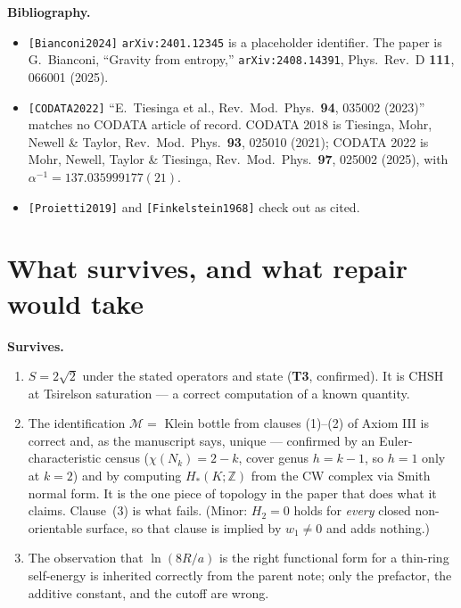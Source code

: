 \documentclass[11pt,a4paper]{article}
\begin{document}
\textbf{Bibliography.}
\begin{itemize}[leftmargin=1.2em]
\item \texttt{[Bianconi2024]} \verb|arXiv:2401.12345| is a placeholder identifier.
  The paper is G.~Bianconi, ``Gravity from entropy,''
  \verb|arXiv:2408.14391|, Phys.\ Rev.\ D \textbf{111}, 066001 (2025).
\item \texttt{[CODATA2022]} ``E.~Tiesinga et al., Rev.\ Mod.\ Phys.\ \textbf{94},
  035002 (2023)'' matches no CODATA article of record. CODATA 2018 is Tiesinga,
  Mohr, Newell \& Taylor, Rev.\ Mod.\ Phys.\ \textbf{93}, 025010 (2021); CODATA 2022
  is Mohr, Newell, Taylor \& Tiesinga, Rev.\ Mod.\ Phys.\ \textbf{97}, 025002 (2025),
  with $\alpha^{-1} = 137.035999177(21)$.
\item \texttt{[Proietti2019]} and \texttt{[Finkelstein1968]} check out as cited.
\end{itemize}

\section{What survives, and what repair would take}
\label{sec:survives}

\textbf{Survives.}
\begin{enumerate}[leftmargin=1.4em]
\item $S = 2\sqrt2$ under the stated operators and state (\textbf{T3}, confirmed).
  It is CHSH at Tsirelson saturation --- a correct computation of a known quantity.
\item The identification $\mathcal{M} = $ Klein bottle from clauses (1)--(2) of
  Axiom III is correct and, as the manuscript says, unique --- confirmed by an
  Euler-characteristic census ($\chi(N_k)=2-k$, cover genus $h=k-1$, so $h=1$ only at
  $k=2$) and by computing $H_*(K;\mathbb{Z})$ from the CW complex via Smith normal
  form. It is the one piece of topology in the paper that does what it claims.
  Clause~(3) is what fails. (Minor: $H_2=0$ holds for \emph{every} closed
  non-orientable surface, so that clause is implied by $w_1\neq0$ and adds nothing.)
\item The observation that $\ln(8R/a)$ is the right functional form for a thin-ring
  self-energy is inherited correctly from the parent note; only the prefactor,
  the additive constant, and the cutoff are wrong.
\end{enumerate}
\end{document}
